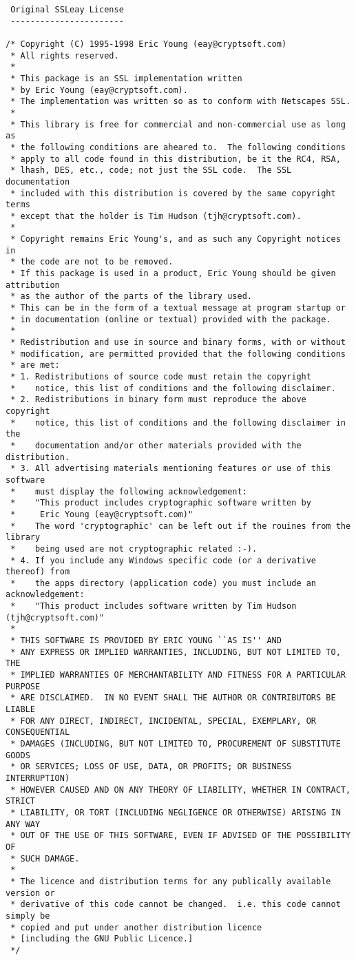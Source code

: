 \begin{lstlisting}
 Original SSLeay License
 -----------------------

/* Copyright (C) 1995-1998 Eric Young (eay@cryptsoft.com)
 * All rights reserved.
 *
 * This package is an SSL implementation written
 * by Eric Young (eay@cryptsoft.com).
 * The implementation was written so as to conform with Netscapes SSL.
 *
 * This library is free for commercial and non-commercial use as long as
 * the following conditions are aheared to.  The following conditions
 * apply to all code found in this distribution, be it the RC4, RSA,
 * lhash, DES, etc., code; not just the SSL code.  The SSL documentation
 * included with this distribution is covered by the same copyright terms
 * except that the holder is Tim Hudson (tjh@cryptsoft.com).
 *
 * Copyright remains Eric Young's, and as such any Copyright notices in
 * the code are not to be removed.
 * If this package is used in a product, Eric Young should be given attribution
 * as the author of the parts of the library used.
 * This can be in the form of a textual message at program startup or
 * in documentation (online or textual) provided with the package.
 *
 * Redistribution and use in source and binary forms, with or without
 * modification, are permitted provided that the following conditions
 * are met:
 * 1. Redistributions of source code must retain the copyright
 *    notice, this list of conditions and the following disclaimer.
 * 2. Redistributions in binary form must reproduce the above copyright
 *    notice, this list of conditions and the following disclaimer in the
 *    documentation and/or other materials provided with the distribution.
 * 3. All advertising materials mentioning features or use of this software
 *    must display the following acknowledgement:
 *    "This product includes cryptographic software written by
 *     Eric Young (eay@cryptsoft.com)"
 *    The word 'cryptographic' can be left out if the rouines from the library
 *    being used are not cryptographic related :-).
 * 4. If you include any Windows specific code (or a derivative thereof) from
 *    the apps directory (application code) you must include an acknowledgement:
 *    "This product includes software written by Tim Hudson (tjh@cryptsoft.com)"
 *
 * THIS SOFTWARE IS PROVIDED BY ERIC YOUNG ``AS IS'' AND
 * ANY EXPRESS OR IMPLIED WARRANTIES, INCLUDING, BUT NOT LIMITED TO, THE
 * IMPLIED WARRANTIES OF MERCHANTABILITY AND FITNESS FOR A PARTICULAR PURPOSE
 * ARE DISCLAIMED.  IN NO EVENT SHALL THE AUTHOR OR CONTRIBUTORS BE LIABLE
 * FOR ANY DIRECT, INDIRECT, INCIDENTAL, SPECIAL, EXEMPLARY, OR CONSEQUENTIAL
 * DAMAGES (INCLUDING, BUT NOT LIMITED TO, PROCUREMENT OF SUBSTITUTE GOODS
 * OR SERVICES; LOSS OF USE, DATA, OR PROFITS; OR BUSINESS INTERRUPTION)
 * HOWEVER CAUSED AND ON ANY THEORY OF LIABILITY, WHETHER IN CONTRACT, STRICT
 * LIABILITY, OR TORT (INCLUDING NEGLIGENCE OR OTHERWISE) ARISING IN ANY WAY
 * OUT OF THE USE OF THIS SOFTWARE, EVEN IF ADVISED OF THE POSSIBILITY OF
 * SUCH DAMAGE.
 *
 * The licence and distribution terms for any publically available version or
 * derivative of this code cannot be changed.  i.e. this code cannot simply be
 * copied and put under another distribution licence
 * [including the GNU Public Licence.]
 */
\end{lstlisting}

